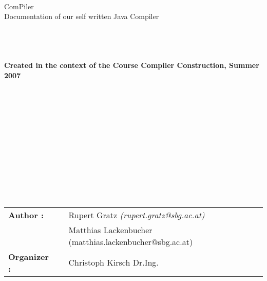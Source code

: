 \thispagestyle{empty}
\begin{center}

\end{center}
\begin{verbatim}





\end{verbatim}
\begin{center}
\huge{ComPiler}\\
\huge{Documentation of our self written Java Compiler}\\
\begin{verbatim}


\end{verbatim}

\end{center}
\begin{verbatim}


\end{verbatim}
\begin{center}
\Large\textbf{Created in the context of the Course Compiler Construction, Summer 2007}
\end{center}
\begin{verbatim}














\end{verbatim}
\begin{flushleft}
\begin{tabular}{lllll}
\textbf{Author :} & &  Rupert Gratz \textsl{   (rupert.gratz@sbg.ac.at)}\\
& & Matthias Lackenbucher (matthias.lackenbucher@sbg.ac.at)
& & \\
\textbf{Organizer :} & &  Christoph Kirsch Dr.Ing.
\end{tabular}
\end{flushleft}
